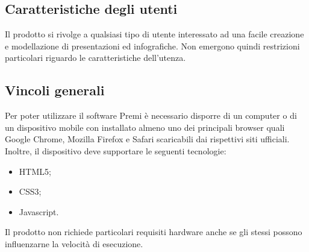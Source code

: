 {\subsection{Caratteristiche degli utenti}{
	Il prodotto si rivolge a qualsiasi tipo di utente interessato ad una facile creazione e modellazione di presentazioni ed infografiche. Non emergono quindi restrizioni particolari riguardo le caratteristiche dell'utenza.
}
\subsection{Vincoli generali}{
	Per poter utilizzare il software Premi è necessario disporre di un computer o di un dispositivo mobile con installato almeno uno dei principali browser quali Google Chrome, Mozilla Firefox e Safari scaricabili dai rispettivi siti ufficiali. Inoltre, il dispositivo deve supportare le seguenti tecnologie:
	\begin{itemize}
		\item HTML5;
		\item CSS3;
		\item Javascript.
	\end{itemize}
	Il prodotto non richiede particolari requisiti hardware anche se gli stessi possono influenzarne la velocità di esecuzione.
	}
}